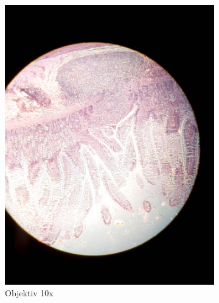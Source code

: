 \begin{figure}[h!]
\begin{subfigure}[b]{0.3\textwidth}
		\includegraphics[width=1\textwidth]{../images/02_mammal_illeum.jpg}
		\caption{Objektiv 10x}
		\label{fig:02_mammal_ileum}
	\end{subfigure}
	\begin{subfigure}[b]{0.3\textwidth}

\end{subfigure}
\end{figure}
